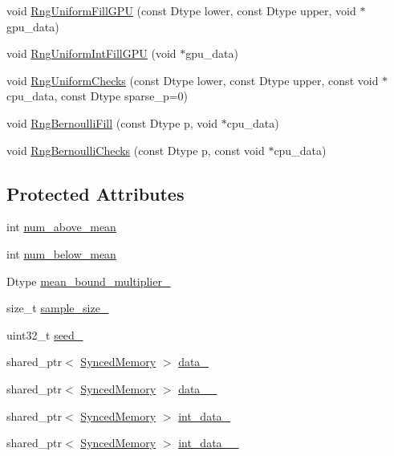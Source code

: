 \begin{DoxyCompactItemize}
\item 
void \hyperlink{classcaffe_1_1_random_number_generator_test_a56f2663c29c44445369573d484a6d1ca}{Rng\+Uniform\+Fill\+G\+P\+U} (const Dtype lower, const Dtype upper, void $\ast$gpu\+\_\+data)
\item 
void \hyperlink{classcaffe_1_1_random_number_generator_test_ae731201dd6d8c588306e044787a64954}{Rng\+Uniform\+Int\+Fill\+G\+P\+U} (void $\ast$gpu\+\_\+data)
\item 
void \hyperlink{classcaffe_1_1_random_number_generator_test_adda371a2186747f91efa3bdd400c95f1}{Rng\+Uniform\+Checks} (const Dtype lower, const Dtype upper, const void $\ast$cpu\+\_\+data, const Dtype sparse\+\_\+p=0)
\item 
void \hyperlink{classcaffe_1_1_random_number_generator_test_af2759f33fedb94c8cf324a61081fe61e}{Rng\+Bernoulli\+Fill} (const Dtype p, void $\ast$cpu\+\_\+data)
\item 
void \hyperlink{classcaffe_1_1_random_number_generator_test_ac44cfd5c9c9a09961e1385e95dc91e22}{Rng\+Bernoulli\+Checks} (const Dtype p, const void $\ast$cpu\+\_\+data)
\end{DoxyCompactItemize}
\subsection*{Protected Attributes}
\begin{DoxyCompactItemize}
\item 
int \hyperlink{classcaffe_1_1_random_number_generator_test_a039d6584b589e0f3e87d215c7a230fce}{num\+\_\+above\+\_\+mean}
\item 
int \hyperlink{classcaffe_1_1_random_number_generator_test_ab2744cd1e3f41449e2b4b2ea9087f458}{num\+\_\+below\+\_\+mean}
\item 
Dtype \hyperlink{classcaffe_1_1_random_number_generator_test_a7af6670320b4dd8b29edd00fcd33c899}{mean\+\_\+bound\+\_\+multiplier\+\_\+}
\item 
size\+\_\+t \hyperlink{classcaffe_1_1_random_number_generator_test_a1e16c55d83c076ffe898f1db6f7cfc1d}{sample\+\_\+size\+\_\+}
\item 
uint32\+\_\+t \hyperlink{classcaffe_1_1_random_number_generator_test_a8975ddeeefd466b91f1b39db1e526436}{seed\+\_\+}
\item 
shared\+\_\+ptr$<$ \hyperlink{classcaffe_1_1_synced_memory}{Synced\+Memory} $>$ \hyperlink{classcaffe_1_1_random_number_generator_test_a0d9fe79538e2af9fdd25f93a4fe3efe8}{data\+\_\+}
\item 
shared\+\_\+ptr$<$ \hyperlink{classcaffe_1_1_synced_memory}{Synced\+Memory} $>$ \hyperlink{classcaffe_1_1_random_number_generator_test_aa5d1f3c85e7b05ddae63a96ef858f208}{data\+\_\+\_\+}
\item 
shared\+\_\+ptr$<$ \hyperlink{classcaffe_1_1_synced_memory}{Synced\+Memory} $>$ \hyperlink{classcaffe_1_1_random_number_generator_test_a1db28be8828105cc9c187fc6717eef0a}{int\+\_\+data\+\_\+}
\item 
shared\+\_\+ptr$<$ \hyperlink{classcaffe_1_1_synced_memory}{Synced\+Memory} $>$ \hyperlink{classcaffe_1_1_random_number_generator_test_a766746e10a61c6853731eac979c42c55}{int\+\_\+data\+\_\+\_\+}
\end{DoxyCompactItemize}



